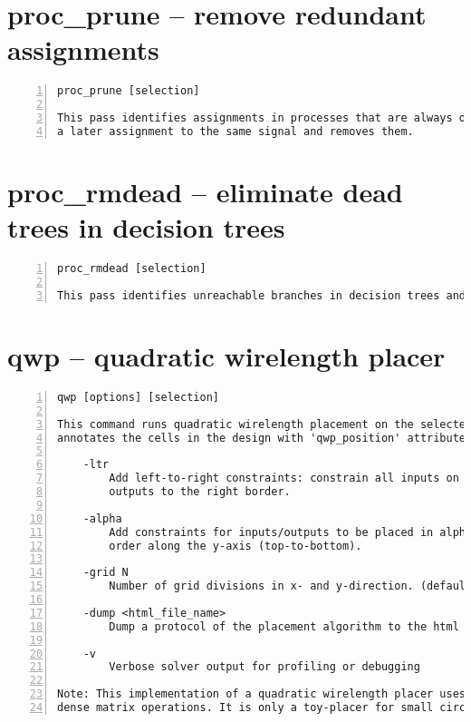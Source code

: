 \section{proc\_prune -- remove redundant assignments}
\label{cmd:proc_prune}
\begin{lstlisting}[numbers=left,frame=single]
    proc_prune [selection]

This pass identifies assignments in processes that are always overwritten by
a later assignment to the same signal and removes them.
\end{lstlisting}

\section{proc\_rmdead -- eliminate dead trees in decision trees}
\label{cmd:proc_rmdead}
\begin{lstlisting}[numbers=left,frame=single]
    proc_rmdead [selection]

This pass identifies unreachable branches in decision trees and removes them.
\end{lstlisting}

\section{qwp -- quadratic wirelength placer}
\label{cmd:qwp}
\begin{lstlisting}[numbers=left,frame=single]
    qwp [options] [selection]

This command runs quadratic wirelength placement on the selected modules and
annotates the cells in the design with 'qwp_position' attributes.

    -ltr
        Add left-to-right constraints: constrain all inputs on the left border
        outputs to the right border.

    -alpha
        Add constraints for inputs/outputs to be placed in alphanumerical
        order along the y-axis (top-to-bottom).

    -grid N
        Number of grid divisions in x- and y-direction. (default=16)

    -dump <html_file_name>
        Dump a protocol of the placement algorithm to the html file.

    -v
        Verbose solver output for profiling or debugging

Note: This implementation of a quadratic wirelength placer uses exact
dense matrix operations. It is only a toy-placer for small circuits.
\end{lstlisting}

